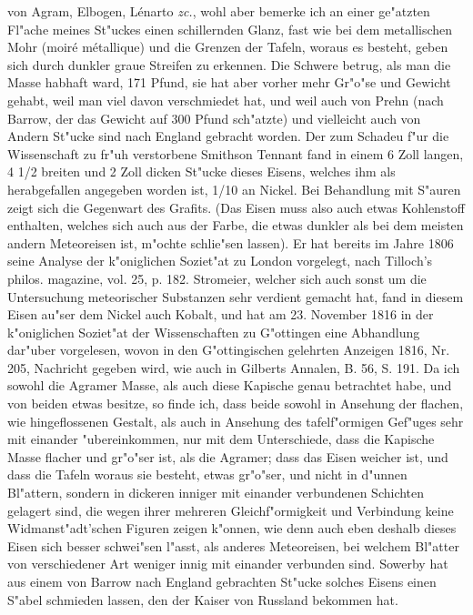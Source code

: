 \documentclass[a4paper, 11pt, oneside, polutonikogreek, german]{article}
\begin{document}
von Agram, Elbogen, Lénarto \emph{zc.}, wohl aber bemerke ich an einer ge"atzten Fl"ache meines St"uckes einen schillernden Glanz, fast wie bei dem metallischen Mohr (moiré métallique) und die Grenzen der Tafeln, woraus es besteht, geben sich durch dunkler graue Streifen zu erkennen. Die Schwere betrug, als man die Masse habhaft ward, 171 Pfund, sie hat aber vorher mehr Gr"o"se und Gewicht gehabt, weil man viel davon verschmiedet hat, und weil auch von Prehn (nach Barrow, der das Gewicht auf 300 Pfund sch"atzte) und vielleicht auch von Andern St"ucke sind nach England gebracht worden. Der zum Schadeu f"ur die Wissenschaft zu fr"uh verstorbene Smithson Tennant fand in einem 6 Zoll langen, 4 1/2 breiten und 2 Zoll dicken St"ucke dieses Eisens, welches ihm als herabgefallen angegeben worden ist, 1/10 an Nickel. Bei Behandlung mit S"auren zeigt sich die Gegenwart des Grafits. (Das Eisen muss also auch etwas Kohlenstoff enthalten, welches sich auch aus der Farbe, die etwas dunkler als bei dem meisten andern Meteoreisen ist, m"ochte schlie"sen lassen). Er hat bereits im Jahre 1806 seine Analyse der k"oniglichen Soziet"at zu London vorgelegt, nach Tilloch's philos. magazine, vol. 25, p. 182. Stromeier, welcher sich auch sonst um die Untersuchung meteorischer Substanzen sehr verdient gemacht hat, fand in diesem Eisen au"ser dem Nickel auch Kobalt, und hat am 23. November 1816 in der k"oniglichen Soziet"at der Wissenschaften zu G"ottingen eine Abhandlung dar"uber vorgelesen, wovon in den G"ottingischen gelehrten Anzeigen 1816, Nr. 205, Nachricht gegeben wird, wie auch in Gilberts Annalen, B. 56, S. 191. Da ich sowohl die Agramer Masse, als auch diese Kapische genau betrachtet habe, und von beiden etwas besitze, so finde ich, dass beide sowohl in Ansehung der flachen, wie hingeflossenen Gestalt, als auch in Ansehung des tafelf"ormigen Gef"uges sehr mit einander "ubereinkommen, nur mit dem Unterschiede, dass die Kapische Masse flacher und gr"o"ser ist, als die Agramer; dass das Eisen weicher ist, und dass die Tafeln woraus sie besteht, etwas gr"o"ser, und nicht in d"unnen Bl"attern, sondern in dickeren inniger mit einander verbundenen Schichten gelagert sind, die wegen ihrer mehreren Gleichf"ormigkeit und Verbindung keine Widmanst"adt'schen Figuren zeigen k"onnen, wie denn auch eben deshalb dieses Eisen sich besser schwei"sen l"asst, als anderes Meteoreisen, bei welchem Bl"atter von verschiedener Art weniger innig mit einander verbunden sind. Sowerby hat aus einem von Barrow nach England gebrachten St"ucke solches Eisens einen S"abel schmieden lassen, den der Kaiser von Russland bekommen hat.
\end{document}
